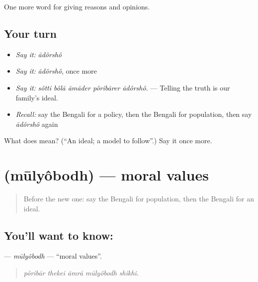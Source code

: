 \begin{grammarlens}[title={What you've built}]
One more word for giving reasons and opinions.
\end{grammarlens}

\subsection*{Your turn}
\begin{itemize}
\raggedright
  \item \emph{Say it:} \emph{ādôrshô}
  \item \emph{Say it:} \emph{ādôrshô}, once more
  \item \emph{Say it:} \emph{sôtti bôlā āmāder pôribārer ādôrshô.} — Telling the truth is our family's ideal.
  \item \emph{Recall:} say the Bengali for a policy, then the Bengali for population, then say \emph{ādôrshô} again
\end{itemize}

\begin{tcolorbox}[breakable,colback=teal!4,colframe=teal!35!black,title={Before you move on}]
What does  mean? (\textquotedblleft{}An ideal; a model to follow\textquotedblright{}.) Say it once more.
\end{tcolorbox}
\section[\texorpdfstring{\bn{মূল্যবোধ} (mūlyôbodh)}{মূল্যবোধ (mūlyôbodh)}]{ (mūlyôbodh) — moral values}

\label{lesson:BN-C350-mulyobodh}



\begin{quote}
Before the new one: say the Bengali for population, then the Bengali for an ideal.
\end{quote}

\subsection*{You'll want to know: }
\textbf{} — \emph{mūlyôbodh} — \textquotedblleft{}moral values\textquotedblright{}.

\begin{quote}
    
\end{quote}

\begin{quote}
\emph{pôribār thekei āmrā mūlyôbodh shikhi.}
\end{quote}

